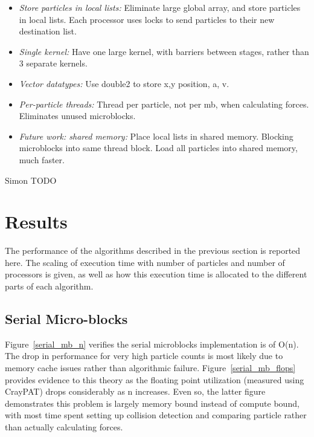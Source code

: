 \documentclass[11pt]{article} %
\begin{document}
\begin{itemize}
\item {\em Store particles in local lists: } Eliminate large global array, and store particles in local lists. Each processor uses locks to send particles to their new destination list.

\item {\em Single kernel: } Have one large kernel, with barriers between stages, rather than 3 separate kernels.

\item {\em Vector datatypes: } Use double2 to store x,y position, a, v.

\item {\em Per-particle threads: } Thread per particle, not per mb, when calculating forces. Eliminates unused microblocks.

\item {\em Future work: shared memory: } Place local lists in shared memory. Blocking microblocks into same thread block. Load all particles into shared memory, much faster.

\end{itemize}

Simon TODO




\section{Results}
\label{results-section}

The performance of the algorithms described in the previous section is reported here. The scaling of execution time with number of particles and number of processors is given, as well as how this execution time is allocated to the different parts of each algorithm.

\subsection{Serial Micro-blocks}

Figure~\ref{serial_mb_n} verifies the serial microblocks implementation is of O(n). The drop in performance for very high particle counts is most likely due to memory cache issues rather than algorithmic failure. Figure~\ref{serial_mb_flops} provides evidence to this theory as the floating point utilization (measured using CrayPAT) drops considerably as n increases. Even so, the latter figure demonstrates this problem is largely memory bound instead of compute bound, with most time spent setting up collision detection and comparing particle rather than actually calculating forces.
\end{document}

